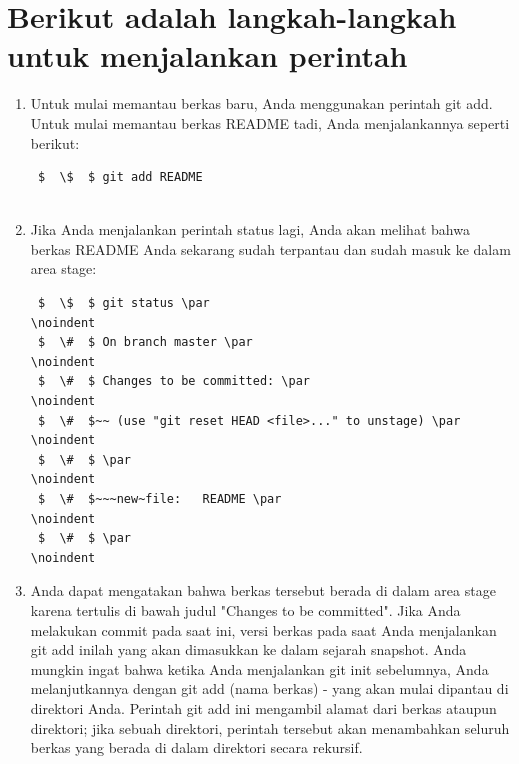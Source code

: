  \section{Berikut adalah langkah-langkah untuk menjalankan perintah}
 
  \begin{enumerate}


\item Untuk mulai memantau berkas baru, Anda menggunakan perintah git add. Untuk mulai memantau berkas README tadi, Anda menjalankannya seperti berikut: \par
\vspace{12pt}
\noindent 
\begin{verbatim}
 $  \$  $ git add README
 
 \end{verbatim}
  \par
\vspace{12pt}
\noindent 

\item Jika Anda menjalankan perintah status lagi, Anda akan melihat bahwa berkas README Anda sekarang sudah terpantau dan sudah masuk ke dalam area stage: \par
\vspace{12pt}
\noindent 

\begin{verbatim}
 $  \$  $ git status \par
\noindent 
 $  \#  $ On branch master \par
\noindent 
 $  \#  $ Changes to be committed: \par
\noindent 
 $  \#  $~~ (use "git reset HEAD <file>..." to unstage) \par
\noindent 
 $  \#  $ \par
\noindent 
 $  \#  $~~~new~file:   README \par
\noindent 
 $  \#  $ \par
\noindent 

 \end{verbatim}

\item Anda dapat mengatakan bahwa berkas tersebut berada di dalam area stage karena tertulis di bawah judul "Changes to be committed". Jika Anda melakukan commit pada saat ini, versi berkas pada saat Anda menjalankan git add inilah yang akan dimasukkan ke dalam sejarah snapshot. Anda mungkin ingat bahwa ketika Anda menjalankan git init sebelumnya, Anda melanjutkannya dengan git add (nama berkas) - yang akan mulai dipantau di direktori Anda. Perintah git add ini mengambil alamat dari berkas ataupun direktori; jika sebuah direktori, perintah tersebut akan menambahkan seluruh berkas yang berada di dalam direktori secara rekursif. \par
\vspace{12pt}
\noindent 


\end{enumerate}
